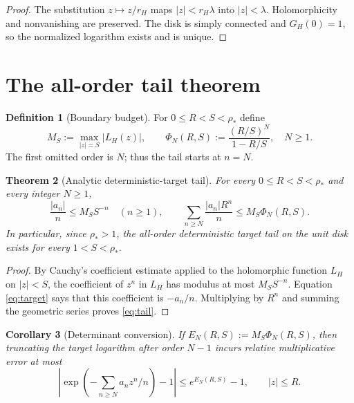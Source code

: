 \documentclass[11pt]{article}
\newtheorem{theorem}{Theorem}[section]
\newtheorem{corollary}[theorem]{Corollary}
\theoremstyle{definition}
\newtheorem{definition}[theorem]{Definition}
\theoremstyle{remark}
\begin{document}
\begin{proof}
The substitution $z\mapsto z/r_H$ maps $|z|<r_H\lambda$ into
$|z|<\lambda$.  Holomorphicity and nonvanishing are preserved.  The disk is
simply connected and $G_H(0)=1$, so the normalized logarithm exists and is
unique.
\end{proof}

\section{The all-order tail theorem}

\begin{definition}[Boundary budget]
For $0\le R<S<\rho_*$ define
\begin{equation}
 M_S:=\max_{|z|=S}|L_H(z)|,
 \qquad
 \Phi_N(R,S):=\frac{(R/S)^N}{1-R/S},
 \quad N\ge1.
 \label{eq:budget}
\end{equation}
The first omitted order is $N$; thus the tail starts at $n=N$.
\end{definition}

\begin{theorem}[Analytic deterministic-target tail]
\label{thm:tail}
For every $0\le R<S<\rho_*$ and every integer $N\ge1$,
\begin{equation}
 \frac{|a_n|}{n}\le M_S S^{-n}\quad(n\ge1),
 \qquad
 \sum_{n\ge N}\frac{|a_n|R^n}{n}
 \le M_S\Phi_N(R,S).
 \label{eq:tail}
\end{equation}
In particular, since $\rho_*>1$, the all-order deterministic target tail on
the unit disk exists for every $1<S<\rho_*$.
\end{theorem}

\begin{proof}
By Cauchy's coefficient estimate applied to the holomorphic function $L_H$ on
$|z|<S$, the coefficient of $z^n$ in $L_H$ has modulus at most
$M_SS^{-n}$.  Equation \eqref{eq:target} says that this coefficient is
$-a_n/n$.  Multiplying by $R^n$ and summing the geometric series proves
\eqref{eq:tail}.
\end{proof}

\begin{corollary}[Determinant conversion]
\label{cor:exp}
If $E_N(R,S):=M_S\Phi_N(R,S)$, then truncating the target logarithm after
order $N-1$ incurs relative multiplicative error at most
\begin{equation}
 \left|\exp\!\left(-\sum_{n\ge N}a_nz^n/n\right)-1\right|
 \le e^{E_N(R,S)}-1,
 \qquad |z|\le R.
 \label{eq:exp-error}
\end{equation}
\end{corollary}
\end{document}
